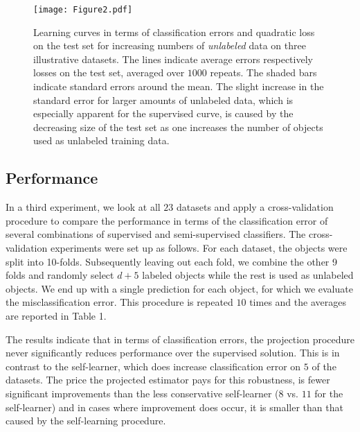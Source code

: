 \documentclass{article}
\begin{document}
\begin{figure*}
\centering
\texttt{[image: Figure2.pdf]}
\caption{Learning curves in terms of classification errors and quadratic loss on the test set for increasing numbers of \emph{unlabeled} data on three illustrative datasets. The lines indicate average errors respectively losses on the test set, averaged over $1000$ repeats. The shaded bars indicate standard errors around the mean. The slight increase in the standard error for larger amounts of unlabeled data, which is especially apparent for the supervised curve, is caused by the decreasing size of the test set as one increases the number of objects used as unlabeled training data.}
\label{fig:learningcurves}
\end{figure*}

\subsection{Performance}
In a third experiment, we look at all $23$ datasets and apply a cross-validation procedure to compare the performance in terms of the classification error of several combinations of supervised and semi-supervised classifiers. The cross-validation experiments were set up as follows. For each dataset, the objects were split into 10-folds. Subsequently leaving out each fold, we combine the other 9 folds and randomly select $d+5$ labeled objects while the rest is used as unlabeled objects. We end up with a single prediction for each object, for which we evaluate the misclassification error. This procedure is repeated $10$ times and the averages are reported in Table 1.

The results indicate that in terms of classification errors, the projection procedure never significantly reduces performance over the supervised solution. This is in contrast to the self-learner, which does increase classification error on $5$ of the datasets. The price the projected estimator pays for this robustness, is fewer significant improvements than the less conservative self-learner ($8$ vs. $11$ for the self-learner) and in cases where improvement does occur, it is smaller than that caused by the self-learning procedure.

\end{document}

